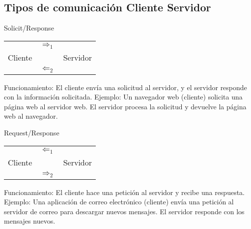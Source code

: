 \documentclass[a4paper,12pt]{article}
\begin{document}
\subsection{Tipos de comunicación Cliente Servidor}

\begin{center}
\begin{minipage}[t]{0.45\textwidth}
    \begin{center}
        Solicit/Response    

        \begin{tabular}{c c c}
                    & $\Rightarrow_{1}$ &  \\ 
            Cliente &               & Servidor \\
                    & $\Leftarrow_{2}$ &  \\ 
        \end{tabular}
    \end{center}

    Funcionamiento: El cliente envía una solicitud al servidor, y el servidor responde con la información solicitada.
    Ejemplo: Un navegador web (cliente) solicita una página web al servidor web. El servidor procesa la solicitud y devuelve la página web al navegador.
\end{minipage}
\hspace{15mm}
\begin{minipage}[t]{0.45\textwidth}
    \begin{center}
        Request/Response    

        \begin{tabular}{c c c}
                    & $\Leftarrow_{1}$ &  \\                 
            Cliente &               & Servidor \\
                    & $\Rightarrow_{2}$ &  \\ 
        
        \end{tabular}
    \end{center}

    Funcionamiento: El cliente hace una petición al servidor y recibe una respuesta. 
    Ejemplo: Una aplicación de correo electrónico (cliente) envía una petición al servidor de correo para descargar nuevos mensajes. El servidor responde con los mensajes nuevos.
\end{minipage}
\end{center}
\end{document}
